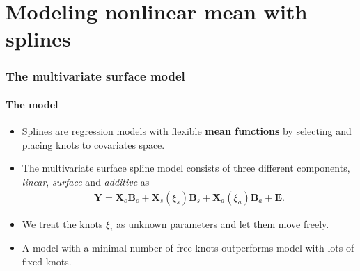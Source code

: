 \documentclass[11pt]{beamer}
\begin{document}
\section{Modeling nonlinear mean with splines}

\begin{frame}
  \frametitle{The multivariate surface model}
  \framesubtitle{The model}
  \begin{itemize}
  \item Splines are regression models with flexible \textbf{mean functions} by
    selecting and placing knots to covariates space.

  \item The multivariate surface spline model \citep{li2013efficient} consists of three different components,
    {\color{blue}\emph{linear}}, {\color{blue}\emph{surface}} and
    {\color{blue}\emph{additive}} as
    \[\begin{gathered}
      \bm{Y}=\bm{X}_o\bm{B}_o+
      \bm{X}_s(\xi_s)\bm{B}_s+\bm{X}_a(\xi_a)\bm{B}_a + \bm{E}.
    \end{gathered}\]
  \item We treat the knots $\xi_i$ as unknown parameters and let them move
    freely.
  \item A model with a minimal number of free knots outperforms model
    with lots of fixed knots.
    \end{itemize}
\end{frame}
\end{document}
